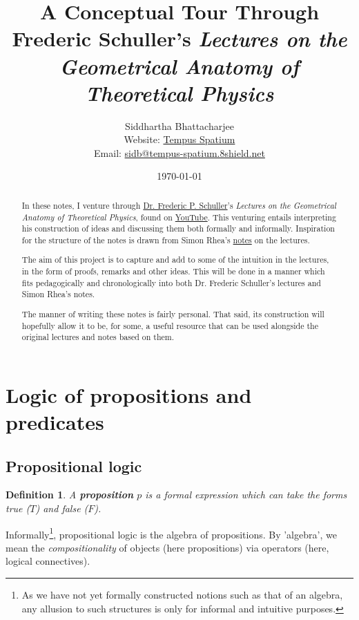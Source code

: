 \documentclass[12pt]{article}
\title{A Conceptual Tour Through Frederic Schuller's \emph{Lectures on the Geometrical Anatomy of Theoretical Physics}}
\author{Siddhartha Bhattacharjee \\
Website: \href{https://booodaness.github.io/tempus-spatium/}{Tempus Spatium} \\
Email: \href{javascript:location.href = 'mailto:' + ['sidb','tempus-spatium.8shield.net'].join('@')}{sidb@tempus-spatium.8shield.net}
}
\affil{Student, B.Sc. (Hons) Mathematical Physics, University of Waterloo}
\date{\today}
\newtheorem{definition}{Definition}[section]
\begin{document}
\maketitle

\begin{abstract}
In these notes, I venture through \href{https://people.utwente.nl/f.p.schuller}{Dr. Frederic P. Schuller}'s \emph{Lectures on the Geometrical Anatomy of Theoretical Physics}, found on \href{https://youtube.com/playlist?list=PLPH7f_7ZlzxTi6kS4vCmv4ZKm9u8g5yic}{YouTube}. This venturing entails interpreting his construction of ideas and discussing them both formally and informally. Inspiration for the structure of the notes is drawn from Simon Rhea's \href{https://mathswithphysics.blogspot.com/2016/07/lectures-on-geometric-anatomy-of.html}{notes} on the lectures.

The aim of this project is to capture and add to some of the intuition in the lectures, in the form of proofs, remarks and other ideas. This will be done in a manner which fits pedagogically and chronologically into both Dr. Frederic Schuller's lectures and Simon Rhea's notes.

The manner of writing these notes is fairly personal. That said, its construction will hopefully allow it to be, for some, a useful resource that can be used alongside the original lectures and notes based on them.
\end{abstract}

\tableofcontents

\section{Logic of propositions and predicates}

\subsection{Propositional logic}

\begin{shaded}
\begin{definition}
A \textbf{proposition} $p$ is a formal expression which can take the forms \emph{true} ($T$) and \emph{false} ($F$).
\end{definition}
\end{shaded}

Informally\footnote{As we have not yet formally constructed notions such as that of an algebra, any allusion to such structures is only for informal and intuitive purposes.}, propositional logic is the algebra of propositions. By 'algebra', we mean the \emph{compositionality} of objects (here propositions) via operators (here, logical connectives).
\end{document}
